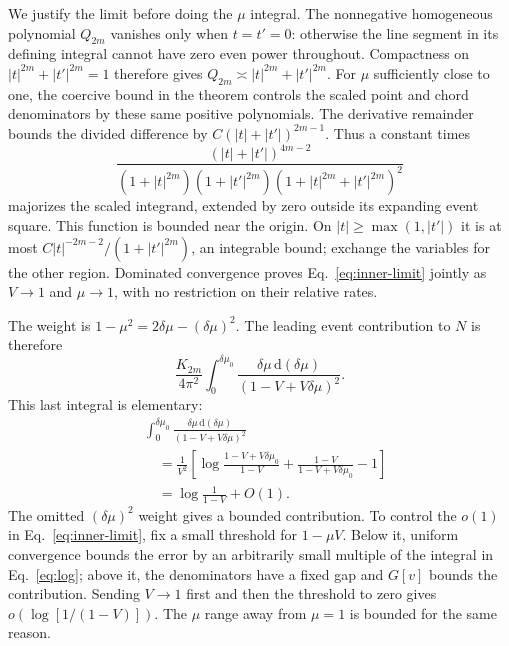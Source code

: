 \documentclass[11pt]{article}
\newcommand{\dd}{\mathrm d}
\begin{document}
We justify the limit before doing the $\mu$ integral.
The nonnegative homogeneous polynomial $Q_{2m}$ vanishes only when
$t=t'=0$: otherwise the line segment in its defining integral
cannot have zero even power throughout. Compactness on
$|t|^{2m}+|t'|^{2m}=1$ therefore gives
$Q_{2m}\asymp |t|^{2m}+|t'|^{2m}$.
For $\mu$ sufficiently close to one, the coercive bound in the
theorem controls the scaled point and chord denominators by these
same positive polynomials. The derivative remainder bounds the
divided difference by $C(|t|+|t'|)^{2m-1}$.
Thus a constant times
\begin{equation}
 \frac{(|t|+|t'|)^{4m-2}}
 {(1+|t|^{2m})(1+|t'|^{2m})
                  (1+|t|^{2m}+|t'|^{2m})^2}
 \label{eq:majorant}
\end{equation}
majorizes the scaled integrand, extended by zero outside its
expanding event square. This function is bounded near the origin.
On $|t|\ge\max(1,|t'|)$ it is at most
$C|t|^{-2m-2}/(1+|t'|^{2m})$, an integrable bound; exchange the
variables for the other region. Dominated convergence proves
Eq.~\eqref{eq:inner-limit} jointly as $V\to1$ and $\mu\to1$,
with no restriction on their relative rates.

The weight is $1-\mu^2=2\delta\mu-(\delta\mu)^2$.
The leading event contribution to $N$ is therefore
\begin{equation}
 \frac{K_{2m}}{4\pi^2}
 \int_0^{\delta\mu_0}
       \frac{\delta\mu\,\dd(\delta\mu)}{(1-V+V\delta\mu)^2}.
 \label{eq:log-integral}
\end{equation}
This last integral is elementary:
\begin{align}
 &\int_0^{\delta\mu_0}
       \frac{\delta\mu\,\dd(\delta\mu)}{(1-V+V\delta\mu)^2}
       \nonumber\\
 &\quad=\frac1{V^2}\left[
       \log\frac{1-V+V\delta\mu_0}{1-V}
       +\frac{1-V}{1-V+V\delta\mu_0}-1\right]\nonumber\\
 &\quad=\log\frac1{1-V}+O(1).
 \label{eq:log}
\end{align}
The omitted $(\delta\mu)^2$ weight gives a bounded contribution.
To control the $o(1)$ in Eq.~\eqref{eq:inner-limit}, fix a small
threshold for $1-\mu V$. Below it, uniform convergence bounds the
error by an arbitrarily small multiple of the integral in
Eq.~\eqref{eq:log}; above it, the denominators have a fixed gap and
$G[v]$ bounds the contribution. Sending $V\to1$ first and then the
threshold to zero gives $o(\log[1/(1-V)])$.
The $\mu$ range away from $\mu=1$ is bounded for the same reason.
\end{document}
